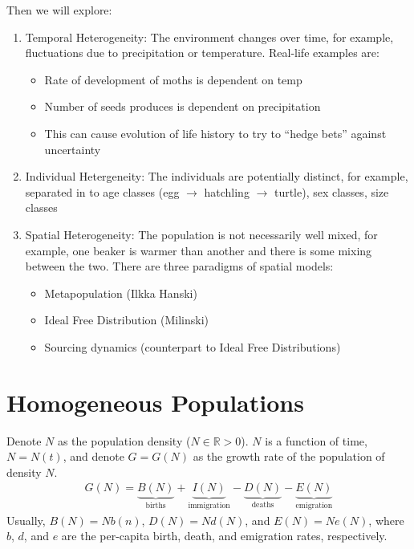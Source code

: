 \documentclass{article}
\newcommand{\Rl}{\mathbb{R}}
\begin{document}
    Then we will explore:
    \begin{enumerate}
        \item Temporal Heterogeneity: The environment changes over time, for example, fluctuations due to precipitation or temperature.  Real-life examples are:
        \begin{itemize}
            \item Rate of development of moths is dependent on temp
            \item Number of seeds produces is dependent on precipitation
            \item This can cause evolution of life history to try to ``hedge bets'' against uncertainty
        \end{itemize}
        \item Individual Hetergeneity: The individuals are potentially distinct, for example, separated in to age classes (egg $\rightarrow$ hatchling $\rightarrow$ turtle), sex classes, size classes
        \item Spatial Heterogeneity: The population is not necessarily well mixed, for example, one beaker is warmer than another and there is some mixing between the two.  There are three paradigms of spatial models:
        \begin{itemize}
            \item Metapopulation (Ilkka Hanski)
            \item Ideal Free Distribution (Milinski)
            \item Sourcing dynamics (counterpart to Ideal Free Distributions)
        \end{itemize}
    \end{enumerate}

    \section{Homogeneous Populations}

    Denote $N$ as the population density ($N \in \Rl > 0$).  $N$ is a function of time, $N = N(t)$, and denote $G = G(N)$ as the growth rate of the population of density $N$.
    \begin{align*}
        G(N) = \underbrace{B(N)}_{\text{births}} + \underbrace{I(N)}_{\text{immigration}} - \underbrace{D(N)}_{\text{deaths}} - \underbrace{E(N)}_{\text{emigration}}
    \end{align*}
    Usually, $B(N) = Nb(n)$, $D(N) = Nd(N)$, and $E(N) = Ne(N)$, where $b$, $d$, and $e$ are the per-capita birth, death, and emigration rates, respectively. \\
\end{document}
